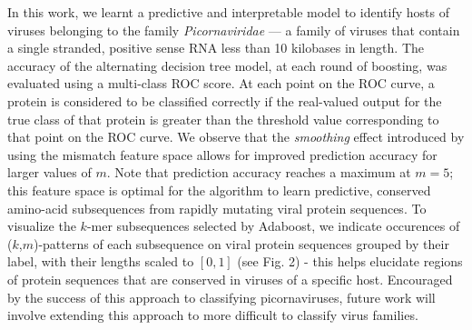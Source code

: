 In this work, we learnt a predictive and interpretable model to identify hosts of viruses 
belonging to the family \textit{Picornaviridae} --- a family of viruses that contain a single 
stranded, positive sense RNA less than 10 kilobases in length. The accuracy of the alternating 
decision tree model, at each round of boosting, was evaluated using a multi-class ROC score.
At each point on the ROC curve, a protein is considered to be classified correctly if the 
real-valued output for the true class of that protein is greater than the threshold value
corresponding to that point on the ROC curve. We observe that the \textit{smoothing} effect introduced
by using the mismatch feature space allows for improved prediction accuracy for larger
values of $m$. Note that prediction accuracy reaches a maximum at $m=5$; this feature space is
optimal for the algorithm to learn predictive, conserved amino-acid subsequences from rapidly 
mutating viral protein sequences. To visualize the $k$-mer subsequences selected by 
Adaboost, we indicate occurences of ($k$,$m$)-patterns of each subsequence on viral protein 
sequences grouped by their label, with their lengths scaled to $[0,1]$ (see Fig. 2) - this helps 
elucidate regions of protein sequences that are conserved in viruses of a specific host. Encouraged 
by the success of this approach to classifying picornaviruses, future work will involve extending 
this approach to more difficult to classify virus families.

